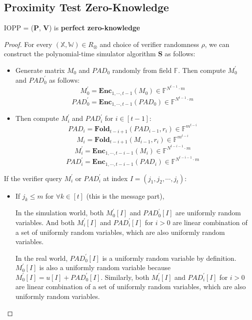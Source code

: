 \subsection{Proximity Test Zero-Knowledge}

\begin{lemma}
\label{lemma:szkpc-zk}

IOPP = ($\textbf{P}$, $\textbf{V}$) is \textbf{perfect zero-knowledge}

\end{lemma}
\begin{proof}

For every $(\mathbb{X}, \mathbb{W}) \in R_\otimes$ and choice of verifier randomness $\rho$, we can construct the polynomial-time simulator algorithm $\textbf{S}$ as follows:


\begin{itemize}
    \item Generate matrix $M_0$ and $PAD_0$ randomly from field $\mathbb{F}$. Then compute $M_0^\prime$ and $PAD_0^\prime$ as follows:
    $$
        M_0^{\prime} = \textbf{Enc}_{1,\cdots,t-1}(M_0) \in \mathbb{F}^{N^{t-1} \cdot m}
    $$
    $$
        PAD_0^{\prime} = \textbf{Enc}_{1,\cdots,t-1}(PAD_0) \in \mathbb{F}^{N^{t-1} \cdot m}
    $$
    \item Then compute $M_i^{\prime}$ and $PAD_i^\prime$ for $i \in [t-1]$:
    $$
        PAD_i = \textbf{Fold}_{t-i+1}(PAD_{i-1}, r_i) \in \mathbb{F}^{m^{t-i}}
    $$
    $$
        M_i = \textbf{Fold}_{t-i+1}(M_{i-1}, r_i) \in \mathbb{F}^{m^{t-i}}
    $$
    $$
        M_i^\prime =  \textbf{Enc}_{1, \cdots, t- i - 1}(M_i) \in \mathbb{F}^{N^{t-i-1} \cdot m}
    $$
    $$
        PAD_i^\prime =  \textbf{Enc}_{1, \cdots, t- i - 1}(PAD_i) \in \mathbb{F}^{N^{t-i-1} \cdot m}
    $$
\end{itemize}

If the verifier query $M_i^{\prime}$ or $PAD_i^\prime$ at index $I = (j_1, j_2, \cdots, j_t)$:

\begin{itemize}
    \item If $j_k \le m$ for $\forall k \in [t]$ (this is the message part),
    
    In the simulation world, both $M_0^\prime[I]$ and $PAD_0^\prime[I]$ are uniformly random variables. And both $M_i^\prime[I]$ and $PAD_i^\prime[I]$ for $i > 0$ are linear combination of a set of uniformly random variables, which are also uniformly random variables.
    
    In the real world, $PAD_0^\prime[I]$ is a uniformly random variable by definition. $M_0^\prime[I]$ is also a uniformly random variable because $M_0^\prime[I] = u[I] + PAD_0^\prime[I]$. Similarly, both $M_i^\prime[I]$ and $PAD_i^\prime[I]$ for $i > 0$ are linear combination of a set of uniformly random variables, which are also uniformly random variables.
    

\end{itemize}
\end{proof}
